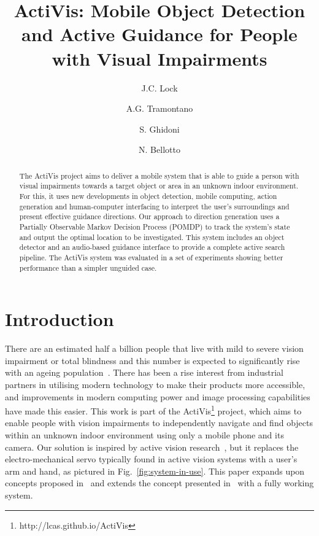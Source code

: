 \documentclass[runningheads]{llncs}
\begin{document}
\title{ActiVis: Mobile Object Detection and Active Guidance for People with Visual Impairments}

\author{J.C. Lock \and
  A.G. Tramontano \and
  S. Ghidoni \and
  N. Bellotto
}

\maketitle

\begin{abstract}
  The ActiVis project aims to deliver a mobile system that is able to guide a person with visual impairments towards a target object or area in an unknown indoor environment. 
  For this, it uses new developments in object detection, mobile computing, action generation and human-computer interfacing to interpret the user's surroundings and present effective guidance directions.
  Our approach to direction generation uses a Partially Observable Markov Decision Process (POMDP) to track the system's state and output the optimal location to be investigated.
  This system includes an object detector and an audio-based guidance interface to provide a complete active search pipeline.
  The ActiVis system was evaluated in a set of experiments showing better performance than a simpler unguided case.
\end{abstract}

\section{Introduction}

There are an estimated half a billion people that live with mild to severe vision impairment or total blindness and this number is expected to significantly rise with an ageing population~\cite{bourne2017magnitude}.
There has been a rise interest from industrial partners in utilising modern technology to make their products more accessible, and improvements in modern computing power and image processing capabilities have made this easier.
This work is part of the ActiVis\footnote{http://lcas.github.io/ActiVis} project, which aims to enable people with vision impairments to independently navigate and find objects within an unknown indoor environment using only a mobile phone and its camera.
Our solution is inspired by active vision research~\cite{bajcsy2017}, but it replaces the electro-mechanical servo typically found in active vision systems with a user's arm and hand, as pictured in Fig.~\ref{fig:system-in-use}.
This paper expands upon concepts proposed in~\cite{bellotto2013,lock2017portable} and extends the concept presented in~\cite{lock2019active} with a fully working system.
\end{document}
